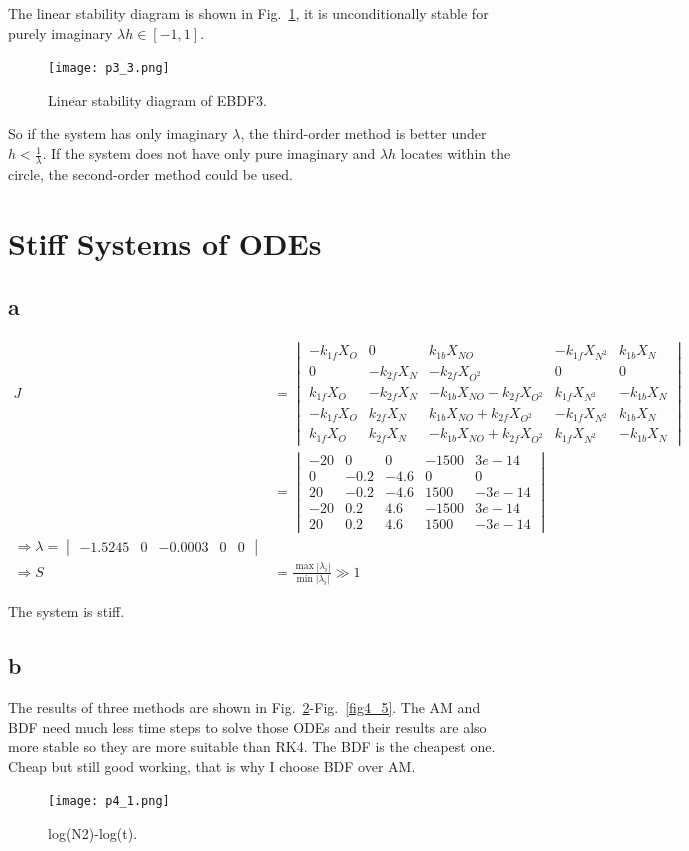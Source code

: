 \documentclass[letterpaper,10pt]{article}
\begin{document}
The linear stability diagram is shown in Fig.~\ref{fig3_3}, it is unconditionally stable for purely imaginary $\lambda h\in [-1,1]$. 
\begin{figure}[h]
  \centering
  \texttt{[image: p3\_3.png]}
  \caption{Linear stability diagram of EBDF3. }
  \label{fig3_3}
\end{figure}

So if the system has only imaginary $\lambda$, the third-order method is better under $h<\frac{1}{\lambda}$. If the system does not have 
only pure imaginary and $\lambda h$ locates within the circle, the second-order method could be used. 
\section{Stiff Systems of ODEs}
\subsection{a}
\begin{align*}
  J&=\begin{vmatrix}
    -k_{1f}X_{O}&0&k_{1b}X_{NO}&-k_{1f}X_{N^2}&k_{1b}X_{N}\\
    0&-k_{2f}X_{N}&-k_{2f}X_{O^2}&0&0\\
    k_{1f}X_{O}&-k_{2f}X_{N}&-k_{1b}X_{NO}-k_{2f}X_{O^2}&k_{1f}X_{N^2}&-k_{1b}X_{N}\\
    -k_{1f}X_{O}&k_{2f}X_{N}&k_{1b}X_{NO}+k_{2f}X_{O^2}&-k_{1f}X_{N^2}&k_{1b}X_{N}\\
    k_{1f}X_{O}&k_{2f}X_{N}&-k_{1b}X_{NO}+k_{2f}X_{O^2}&k_{1f}X_{N^2}&-k_{1b}X_{N}\end{vmatrix}\\
    &=\begin{vmatrix}
      -20&0&0&-1500&3e-14\\
      0&-0.2&-4.6&0&0\\
      20&-0.2&-4.6&1500&-3e-14\\
      -20&0.2&4.6&-1500&3e-14\\
      20&0.2&4.6&1500&-3e-14
  \end{vmatrix}\\
  \Rightarrow \lambda = \begin{vmatrix}
    -1.5245&0&-0.0003&0&0
  \end{vmatrix}\\
  \Rightarrow S&=\frac{\max |\lambda_i|}{\min |\lambda_i|}\gg 1
\end{align*}

The system is stiff. 
\subsection{b}
The results of three methods are shown in Fig.~\ref{fig4_1}-Fig.~\ref{fig4_5}. The AM and BDF need much less time steps to solve those ODEs and their 
results are also more stable so they are more suitable than RK4. The BDF is the cheapest one. Cheap but still good working, that is why I choose BDF over AM. 
\begin{figure}[h]
  \centering
  \texttt{[image: p4\_1.png]}
  \caption{log(N2)-log(t). }
  \label{fig4_1}
\end{figure}
\end{document}
